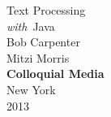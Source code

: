 \cleardoublepage
\pagestyle{empty}
\vspace*{1in}
\begin{center}
{\hfill \fontsize{45}{65}\selectfont Text Processing \\[18pt] \hfill {\fontsize{30}{45}\it with}\ Java}
\\[1in]
{\hfill\Huge Bob Carpenter}
\\[12pt]
{\hfill\Huge Mitzi Morris}
\\[12pt]
\vfill
{\hfill \large\bf Colloquial Media}
\\[1pt]
{\hfill \small New York}
\\[-1pt]
{\hfill \small 2013}
\end{center}
